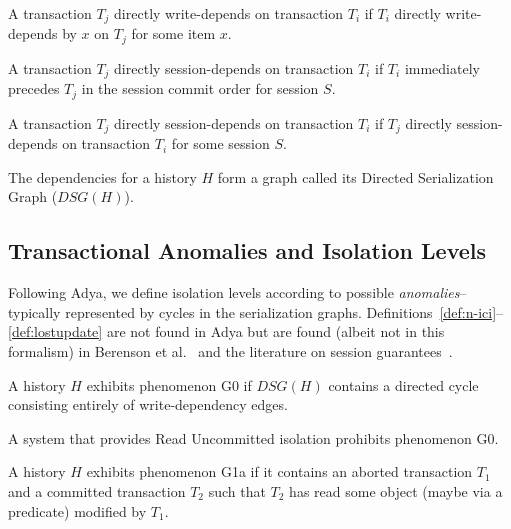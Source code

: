\begin{definition}
A transaction $T_j$ directly write-depends on transaction $T_i$ if
$T_i$ directly write-depends by $x$ on $T_j$ for some item $x$.
\end{definition}

\begin{definition}
\label{def:sd1}
A transaction $T_j$ directly session-depends on transaction $T_i$ if
$T_i$ immediately precedes $T_j$ in the session commit order for session $S$.
\end{definition}

\begin{definition}
\label{def:sd2}
A transaction $T_j$ directly session-depends on transaction $T_i$ if
$T_j$ directly session-depends on transaction $T_i$ for some session
$S$.
\end{definition}

The dependencies for a history $H$ form a graph called its Directed
Serialization Graph ($DSG(H)$).

\subsection{Transactional Anomalies and Isolation Levels}

Following Adya, we define isolation levels according to
possible \textit{anomalies}--typically represented by cycles in the
serialization graphs. Definitions~\ref{def:n-ici}--\ref{def:lostupdate}
are not found in Adya but are found (albeit not in this formalism) in
Berenson et al.~\cite{ansicritique} and the literature on session
guarantees~\cite{sessionguarantees, vogels-defs}.

\begin{definition}
A history $H$ exhibits phenomenon G0 if $DSG(H)$ contains a directed
cycle consisting entirely of write-dependency edges.
\end{definition}

\begin{definition}
A system that provides Read Uncommitted isolation prohibits phenomenon G0.
\end{definition}

\begin{definition}
A history $H$ exhibits phenomenon G1a if it contains an aborted
transaction $T_1$ and a committed transaction $T_2$ such that $T_2$ has read
some object (maybe via a predicate) modiﬁed by $T_1$.
\end{definition}

